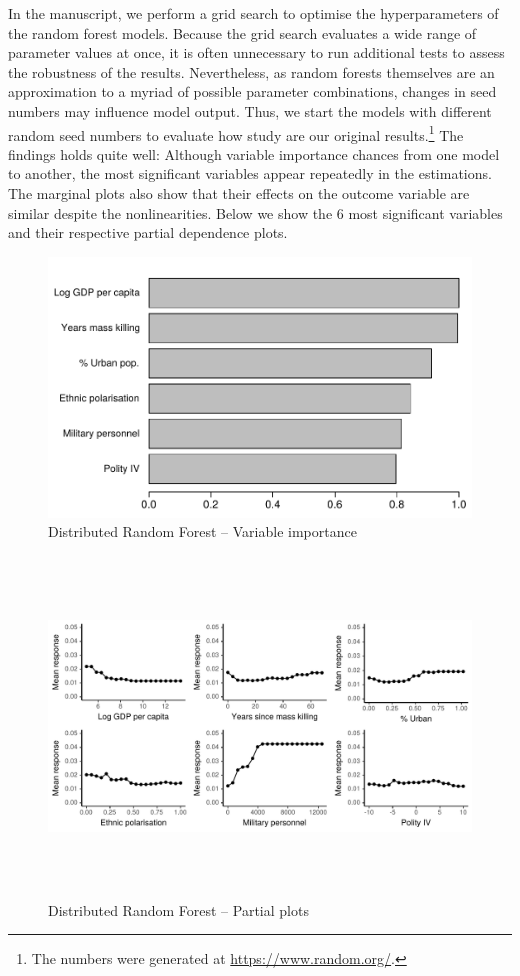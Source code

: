 In the manuscript, we perform a grid search to optimise the hyperparameters of the random forest models. Because the grid search evaluates a wide range of parameter values at once, it is often unnecessary to run additional tests to assess the robustness of the results. Nevertheless, as random forests themselves are an approximation to a myriad of possible parameter combinations, changes in seed numbers may influence model output. Thus, we start the models with different random seed numbers to evaluate how study are our original results.\footnote{The numbers were generated at \href{https://www.random.org/}{https://www.random.org/}.} The findings holds quite well: Although variable importance chances from one model to another, the most significant variables appear repeatedly in the estimations. The marginal plots also show that their effects on the outcome variable are similar despite the nonlinearities. Below we show the 6 most significant variables and their respective partial dependence plots.

\begin{figure}[H]
    \centering
    \includegraphics{images/drf-mk.pdf}
    \caption{Distributed Random Forest -- Variable importance}
    \label{fig:my_label}
\end{figure}

\begin{figure}[H]
    \centering
    \includegraphics[width=\textwidth, height=9cm]{images/drfdpp.pdf}
    \caption{Distributed Random Forest -- Partial plots}
    \label{fig:my_label}
\end{figure}

